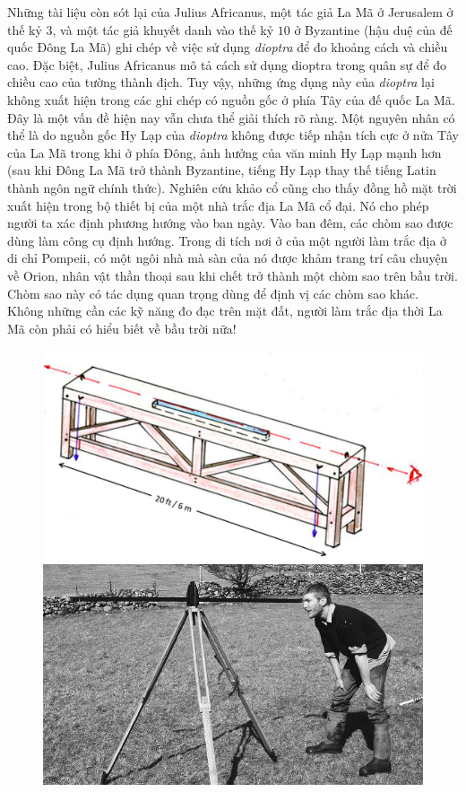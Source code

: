\begin{multicols}{2}
	\vskip 0.1cm
	Những tài liệu còn sót lại của Julius Africanus, một tác giả La Mã ở Jerusalem ở thế kỷ $3$, và một tác giả khuyết danh vào thế kỷ $10$ ở Byzantine (hậu duệ của đế quốc Đông La Mã) ghi chép về việc sử dụng \textit{dioptra} để đo khoảng cách và chiều cao. Đặc biệt, Julius Africanus mô tả cách sử dụng dioptra trong quân sự để đo chiều cao của tường thành địch. Tuy vậy, những ứng dụng này của \textit{dioptra} lại không xuất hiện trong các ghi chép có nguồn gốc ở phía Tây của đế quốc La Mã. Đây là một vấn đề hiện nay vẫn chưa thể giải thích rõ ràng. Một nguyên nhân có thể là do nguồn gốc Hy Lạp của \textit{dioptra} không được tiếp nhận tích cực ở nửa Tây của La Mã trong khi ở phía Đông, ảnh hưởng của văn minh Hy Lạp mạnh hơn (sau khi Đông La Mã trở thành Byzantine, tiếng Hy Lạp thay thế tiếng Latin thành ngôn ngữ chính thức).
	\vskip 0.1cm
	Nghiên cứu khảo cổ cũng cho thấy đồng hồ mặt trời xuất hiện trong bộ thiết bị của một nhà trắc địa La Mã cổ đại. Nó cho phép người ta xác định phương hướng vào ban ngày. Vào ban đêm, các chòm sao được dùng làm công cụ định hướng. Trong di tích nơi ở của một người làm trắc địa ở di chỉ Pompeii, có một ngôi nhà mà  sàn của nó được khảm trang trí câu chuyện về Orion, nhân vật thần thoại sau khi chết trở thành một chòm sao trên bầu trời. Chòm sao này có tác dụng quan trọng dùng để định vị các chòm sao khác. Không những cần các kỹ năng đo đạc trên mặt đất, người làm trắc địa thời La Mã còn phải có hiểu biết về bầu trời nữa!
	\begin{figure}[H]
		\vspace*{-5pt}
		\centering
		\captionsetup{labelformat= empty, justification=centering}
		\includegraphics[width= 0.85\linewidth]{6a}
		\includegraphics[width= 0.85\linewidth]{6}

\end{figure}
\end{multicols}
